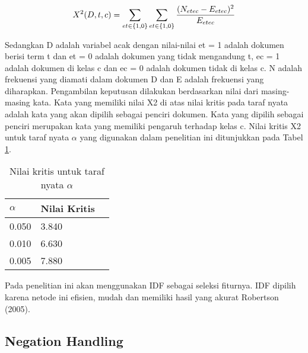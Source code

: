 \begin{equation}
\begin{split}
\tiny
X^2(D, t, c) = \sum\limits_{et\in\{1,0\}}\sum\limits_{et\in\{1,0\}} \frac{(N_{etec} - E_{etec})^2}{E_{etec}}
\label{eq:chi}
\normalsize
\end{split}
\end{equation}

Sedangkan D adalah variabel acak dengan nilai-nilai et = 1 adalah dokumen berisi term t dan et = 0 adalah dokumen yang tidak mengandung t, ec = 1 adalah dokumen di kelas c dan ec = 0 adalah dokumen tidak di kelas c. N adalah frekuensi yang diamati dalam dokumen D dan E adalah frekuensi yang diharapkan. Pengambilan keputusan dilakukan berdasarkan nilai dari masing-masing kata. Kata yang memiliki nilai X2 di atas nilai kritis pada taraf nyata adalah kata yang akan dipilih sebagai penciri dokumen. Kata yang dipilih sebagai penciri merupakan kata yang memiliki pengaruh terhadap kelas c. Nilai kritis  X2  untuk taraf nyata $\alpha$ yang digunakan dalam penelitian ini ditunjukkan pada Tabel  \ref{tab:chisquare}.

\begin{table}[hbt]
	\caption{Nilai kritis untuk taraf nyata $\alpha$}
	\centering
	\begin{tabular}{llr}
		\toprule
		$\alpha$ & Nilai Kritis \\
		\midrule
		0.050 & 3.840 \\
		0.010 & 6.630 \\
		0.005 & 7.880 \\
		\bottomrule
	\end{tabular}
	\label{tab:chisquare}
\end{table}

Pada penelitian ini akan menggunakan IDF sebagai seleksi fiturnya. IDF dipilih karena netode ini efisien, mudah dan memiliki hasil yang akurat Robertson (2005).

\subsection*{Negation Handling}

